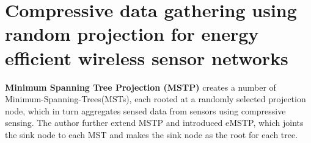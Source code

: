 \section{Compressive data gathering using random projection for energy efficient wireless sensor networks}

\textbf{\textcolor[rgb]{1,0,0}{Minimum Spanning Tree Projection (MSTP)}} creates a number of Minimum-Spanning-Trees(MSTs), each rooted at a randomly selected projection node, which in turn aggregates sensed data from sensors using compressive sensing. The author further extend MSTP and introduced eMSTP, which joints the sink node to each MST and makes the sink node as the root for each tree.


